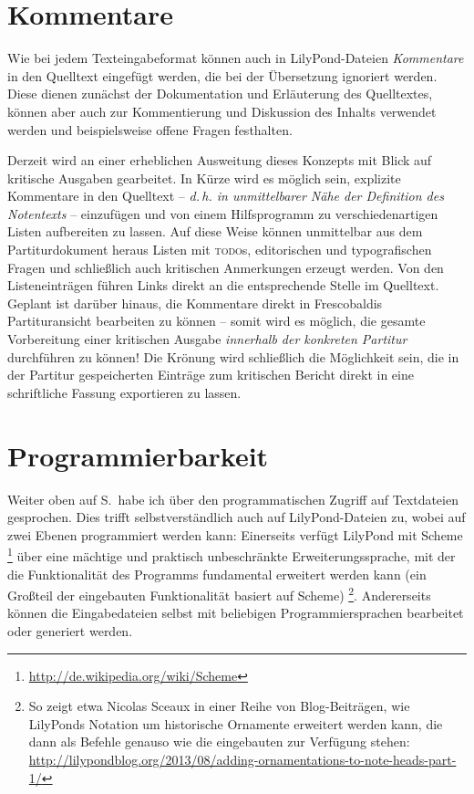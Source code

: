 \documentclass[DIV=12]{scrreprt}
\begin{document}
\section{Kommentare}
\label{sec:pt_lilypond-comments}
Wie bei jedem Texteingabeformat können auch in LilyPond-Dateien \emph{Kommentare} in den Quelltext eingefügt werden, die bei der Übersetzung ignoriert werden.
Diese dienen zunächst der Dokumentation und Erläuterung des Quelltextes, können aber auch zur Kommentierung und Diskussion des Inhalts verwendet werden und beispielsweise offene Fragen festhalten.

Derzeit wird an einer erheblichen Ausweitung dieses Konzepts mit Blick auf kritische Ausgaben gearbeitet.
In Kürze wird es möglich sein, explizite Kommentare in den Quelltext -- \emph{d.\,h. in unmittelbarer Nähe der Definition des Notentexts} -- einzufügen und von einem Hilfsprogramm zu verschiedenartigen Listen aufbereiten zu lassen.
Auf diese Weise können unmittelbar aus dem Partiturdokument heraus Listen mit \textsc{todo}s, editorischen und typografischen Fragen und schließlich auch kritischen Anmerkungen erzeugt werden.
Von den Listeneinträgen führen Links direkt an die entsprechende Stelle im Quelltext.
Geplant ist darüber hinaus, die Kommentare direkt in Frescobaldis Partituransicht bearbeiten zu können -- somit wird es möglich, die gesamte Vorbereitung einer kritischen Ausgabe \emph{innerhalb der konkreten Partitur} durchführen zu können!
Die Krönung wird schließlich die Möglichkeit sein, die in der Partitur gespeicherten Einträge zum kritischen Bericht direkt in eine schriftliche Fassung exportieren zu lassen.

\section{Programmierbarkeit}
\label{sec:pt_lilypond-programmability}
Weiter oben auf S.\,\pageref{sec:pt_programmability} habe ich über den programmatischen Zugriff auf Textdateien gesprochen.
Dies trifft selbstverständlich auch auf LilyPond-Dateien zu, wobei auf zwei Ebenen programmiert werden kann:
Einerseits verfügt LilyPond mit Scheme%
\footnote{\url{http://de.wikipedia.org/wiki/Scheme}}
über eine mächtige und praktisch unbeschränkte Erweiterungssprache, mit der die Funktionalität des Programms fundamental erweitert werden kann (ein Großteil der eingebauten Funktionalität basiert auf Scheme)%
\footnote{So zeigt etwa Nicolas Sceaux in einer Reihe von Blog-Beiträgen, wie LilyPonds Notation um historische Ornamente erweitert werden kann, die dann als Befehle genauso wie die eingebauten zur Verfügung stehen: \url{http://lilypondblog.org/2013/08/adding-ornamentations-to-note-heads-part-1/}}.
Andererseits können die Eingabedateien selbst mit beliebigen Programmiersprachen bearbeitet oder generiert werden.
\end{document}
